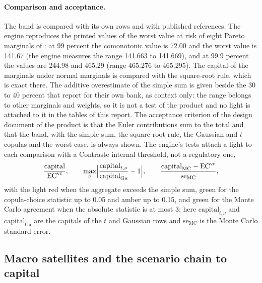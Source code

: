 \paragraph{Comparison and acceptance.}
The band is compared with its own rows and with published references. The engine reproduces the printed values of the worst
value at risk of eight Pareto marginals of \citet{aggregation-stress:embrechts2013}: at 99 percent the comonotonic value is
72.00 and the worst value is 141.67 (the engine measures the range 141.663 to 141.669), and at 99.9 percent the values are 244.98
and 465.29 (range 465.276 to 465.295). The capital of the marginals under normal marginals is compared with the square-root rule, which is exact there. The additive
overestimate of the simple sum is given beside the 30 to 40 percent that \citet{aggregation-stress:rosenberg2006} report for their
own bank, as context only: the range belongs to other marginals and weights, so it is not a test of the product and no light is
attached to it in the tables of this report. The acceptance criterion of the design document of the product is that the Euler contributions sum to the total and
that the band, with the simple sum, the square-root rule, the Gaussian and $t$ copulas and the worst case, is always shown. The
engine's tests attach a light to each comparison with a Contraste internal threshold, not a regulatory one,
\begin{equation}
\frac{\mathrm{capital}}{\mathrm{EC}^{\mathrm{vc}}},\qquad
\max_{\nu}\Bigl\lvert\frac{\mathrm{capital}_{t,\nu}}{\mathrm{capital}_{\mathrm{Ga}}}-1\Bigr\rvert,\qquad
\frac{\mathrm{capital}_{\mathrm{MC}}-\mathrm{EC}^{\mathrm{vc}}}{\mathrm{se}_{\mathrm{MC}}},
\label{eq:ag-tests}
\end{equation}
with the light red when the aggregate exceeds the simple sum, green for the copula-choice statistic up to 0.05 and amber up to
0.15, and green for the Monte Carlo agreement when the absolute statistic is at most 3; here $\mathrm{capital}_{t,\nu}$ and
$\mathrm{capital}_{\mathrm{Ga}}$ are the capitals of the $t$ and Gaussian rows and $\mathrm{se}_{\mathrm{MC}}$ is the Monte Carlo
standard error.

\subsection{Macro satellites and the scenario chain to capital}
\label{sec:m26}

